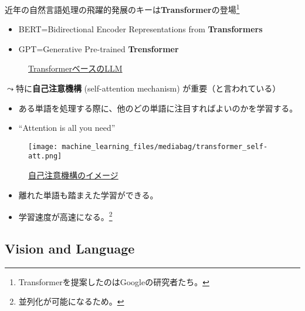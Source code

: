 \documentclass[
  xelatex,
  ja=standard]{bxjsarticle}
\providecommand{\tightlist}{%
  \setlength{\itemsep}{0pt}\setlength{\parskip}{0pt}}\usepackage{longtable,booktabs,array}
\begin{document}
近年の自然言語処理の飛躍的発展のキーは\textbf{Transformer}\citep{vaswani2017}の登場\footnote{Transformerを提案したのはGoogleの研究者たち。}

\begin{itemize}
\tightlist
\item
  BERT=Bidirectional Encoder Representations from \textbf{Transformers}
\item
  GPT=Generative Pre-trained \textbf{Trensformer}
\end{itemize}

\begin{figure}[htpb]

{\centering 

}

\caption{\href{https://huggingface.co/learn/nlp-course/ja/chapter1/4?fw=pt}{TransformerベースのLLM}}

\end{figure}

\(\leadsto\)特に\textbf{自己注意機構} (self-attention mechanism)
が重要（と言われている）

\begin{itemize}
\tightlist
\item
  ある単語を処理する際に、他のどの単語に注目すればよいのかを学習する。
\item
  ``Attention is all you need''\citep{vaswani2017}
\end{itemize}

\begin{figure}[htpb]

{\centering \texttt{[image: machine\_learning\_files/mediabag/transformer\_self-att.png]}

}

\caption{\href{https://jalammar.github.io/illustrated-transformer/}{自己注意機構のイメージ}}

\end{figure}

\begin{itemize}
\tightlist
\item
  離れた単語も踏まえた学習ができる。
\item
  学習速度が高速になる。\footnote{並列化が可能になるため。}
\end{itemize}

\hypertarget{vision-and-language}{%
\subsection{Vision and Language}\label{vision-and-language}}
\end{document}
